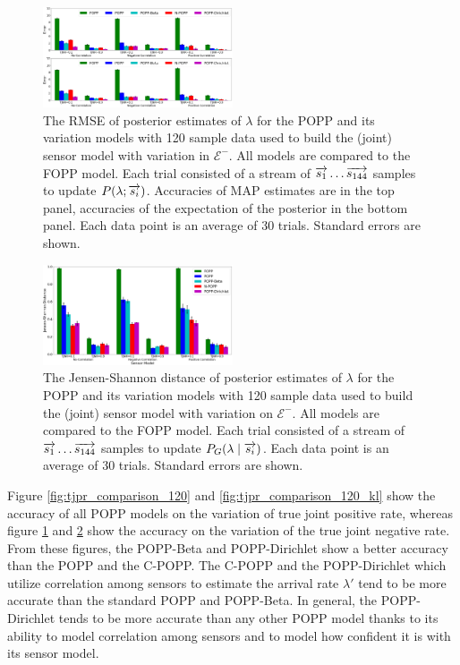 \begin{figure}[t!]
	\centering
	\includegraphics[width=0.5\textwidth]{./figures/tjnr_comparison_120.png}
    \caption{The RMSE of posterior estimates of $\lambda$ for the POPP and its variation models with 120 sample data used to build the (joint) sensor model with variation in $\mathcal{E^-}$. All models are compared to the FOPP model. Each trial consisted of a stream of $\protect\overrightarrow{s_1} \ldots \protect\overrightarrow{s_{144}}$ samples to update $P(\lambda ; \protect\overrightarrow{s_i})$. Accuracies of MAP estimates are  in the top panel, accuracies of the expectation of the posterior in the bottom panel. Each data point is an average of 30 trials. Standard errors are shown.} 
	\label{fig:tjnr_comparison_120}
\end{figure}

\begin{figure}[t!]
	\centering
	\includegraphics[width=0.5\textwidth]{./figures/tjnr_comparison_120_kl.png}
	\caption{The Jensen-Shannon distance of posterior estimates of $\lambda$ for the POPP and its variation models with 120 sample data used to build the (joint) sensor model with variation on $\mathcal{E^-}$. All models are compared to the FOPP model. Each trial consisted of a stream of $\protect\overrightarrow{s_1} \ldots \protect\overrightarrow{s_{144}}$ samples to update $P_G(\lambda \mid \protect\overrightarrow{s_i})$. Each data point is an average of 30 trials. Standard errors are shown.} 
	\label{fig:tjnr_comparison_120_kl}
\end{figure}

Figure \ref{fig:tjpr_comparison_120} and \ref{fig:tjpr_comparison_120_kl} show the accuracy of all POPP models on the variation of true joint positive rate, whereas figure \ref{fig:tjnr_comparison_120} and \ref{fig:tjnr_comparison_120_kl} show the accuracy on the variation of the true joint negative rate. From these figures, the POPP-Beta and POPP-Dirichlet show a better accuracy than the POPP and the C-POPP. The C-POPP and the POPP-Dirichlet which utilize correlation among sensors to estimate the arrival rate $\lambda'$ tend to be more accurate than the standard POPP and POPP-Beta.
In general, the POPP-Dirichlet tends to be more accurate than any other POPP model thanks to its ability to model correlation among sensors and to model how confident it is with its sensor model.

